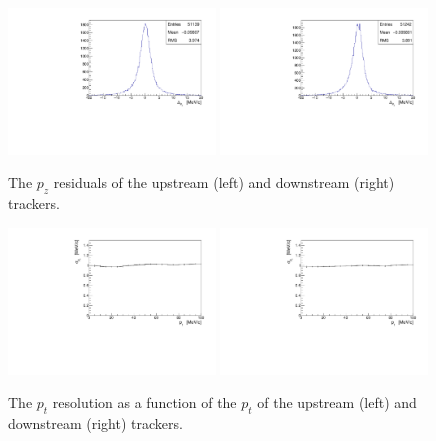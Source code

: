    \begin{figure}[p]
    \begin{center}
      \includegraphics[width=0.49\textwidth, angle=0]{08-Performance/upstream_pz_residual.pdf}
      \includegraphics[width=0.49\textwidth, angle=0]{08-Performance/downstream_pz_residual.pdf}
      \caption{\label{fig:PzResidKalman} The $p_z$ residuals of the upstream (left) and downstream (right) trackers.}
    \end{center}
  \end{figure}
  
  \begin{figure}[p]
   \begin{center}
     \includegraphics[width=0.49\textwidth, angle=0]{08-Performance/upstream_pt_resolution_pt.pdf}
     \includegraphics[width=0.49\textwidth, angle=0]{08-Performance/downstream_pt_resolution_pt.pdf}
     \caption{\label{fig:PtPtResolKalman} The $p_{t}$ resolution as a function of the $p_{t}$ of the upstream (left) and downstream (right) trackers.}
   \end{center}
  \end{figure}
  
